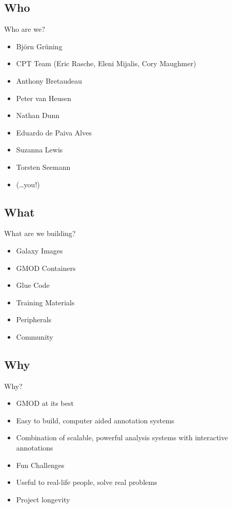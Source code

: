 \documentclass[12pt]{phage3slides} %
\begin{document}
\subsection{Who}
\begin{frame}{Who are we?}
    \begin{itemize}
        \item Bj\"orn Gr\"uning
        \item CPT Team (Eric Rasche, Eleni Mijalis, Cory Maughmer)
        \item Anthony Bretaudeau
        \item Peter van Heusen
        \item Nathan Dunn
        \item Eduardo de Paiva Alves
        \item Suzanna Lewis
        \item Torsten Seemann
        \item (\ldots you!)
    \end{itemize}
\end{frame}

\subsection{What}
\begin{frame}{What are we building?}
    \begin{itemize}
        \item Galaxy Images
        \item GMOD Containers
        \item Glue Code
        \item Training Materials
        \item Peripherals
        \item Community
    \end{itemize}
\end{frame}

\subsection{Why}
\begin{frame}{Why?}
    \begin{itemize}
        \item GMOD at its best
        \item Easy to build, computer aided annotation systems
        \item Combination of scalable, powerful analysis systems with interactive annotations
        \item Fun Challenges
        \item Useful to real-life people, solve real problems
        \item Project longevity
    \end{itemize}
\end{frame}
\end{document}
